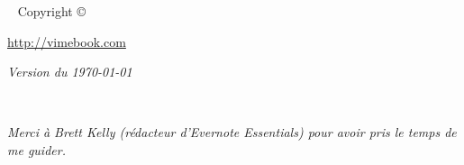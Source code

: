 
\setcounter{tocdepth}{1}



\frontmatter

\maketitle

\newpage
\begin{fullwidth}
~\vfill
\thispagestyle{empty}
\setlength{\parindent}{0pt}
\setlength{\parskip}{\baselineskip}
Copyright \copyright\ \the\year\ \thanklessauthor

\par{}

\par{}

\par \url{http://vimebook.com}
\par\textit{Version du  \today}

\end{fullwidth}

\tableofcontents


\cleardoublepage
~\vfill
\begin{doublespace}
\noindent\fontsize{18}{22}\selectfont\itshape
\nohyphenation
Merci à Brett Kelly (rédacteur d'Evernote Essentials) pour avoir pris le temps de me guider.
\end{doublespace}
\vfill
\vfill

\cleardoublepage



\mainmatter









\listoffigures

\printindex

\listoftables



